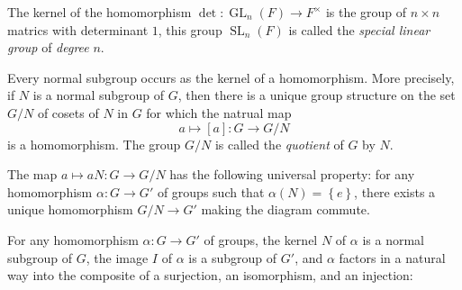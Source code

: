\begin{example}
  \label{example-determinant-kernel}
  The kernel of the homomorphism \( \det: \operatorname{GL}_n(F) \to F^\times \) is the group of \( n \times n \) matrics with determinant \( 1 \), this group \( \operatorname{SL}_n(F) \) is called the \emph{special linear group} of \emph{degree} \( n \).
\end{example}

\begin{proposition}
  \label{proposition-every-normal-subgroup-as-kernel}
  \label{definition-quotient-group}
  Every normal subgroup occurs as the kernel of a homomorphism.
  More precisely, if \( N \) is a normal subgroup of \( G \), then there is a unique group structure on the set \( G / N \) of cosets of \( N \) in \( G \) for which the natrual map
  \[
    a \mapsto [a] : G \to G / N
  \]
  is a homomorphism.
  The group \( G / N \) is called the \emph{quotient} of \( G  \) by \( N \).
\end{proposition}

\begin{proposition}
  \label{proposition-kernel-universal-property}
  The map \( a \mapsto a N: G \to G / N \) has the following universal property:
  for any homomorphism \( \alpha: G \to G' \) of groups such that \( \alpha(N) = \left\lbrace e \right\rbrace \), there exists a unique homomorphism \( G / N \to G' \) making the diagram commute.
\begin{center}
\end{center}
\end{proposition}


\begin{theorem}
  \label{theorem-decomposition-of-homomorphism}
  For any homomorphism \( \alpha: G \to G' \) of groups, the kernel \( N \) of \( \alpha \) is a normal subgroup of \( G \), the image \( I \) of \( \alpha \) is a subgroup of \( G' \), and \( \alpha \) factors in a natural way into the composite of a surjection, an isomorphism, and an injection:
\begin{center}
\end{center}
\end{theorem}

